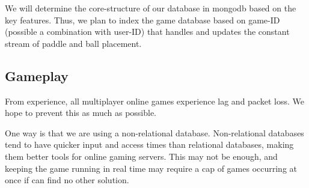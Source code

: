 \documentclass[letterpaper,12pt]{article}
\begin{document}
	We will determine the core-structure of our database in mongodb based on the key features. Thus, we plan to index the game database based on game-ID (possible a combination with user-ID) that handles and updates the constant stream of paddle and ball placement.        	
\subsection{Gameplay}
	From experience, all multiplayer online games experience lag and packet loss. We hope to prevent this as much as possible.
 
	One way is that we are using a non-relational database. Non-relational databases tend to have quicker input and access times than relational databases, making them better tools for online gaming servers. This may not be enough, and keeping the game running in real time may require a cap of games occurring at once if can find no other solution.
\end{document}
